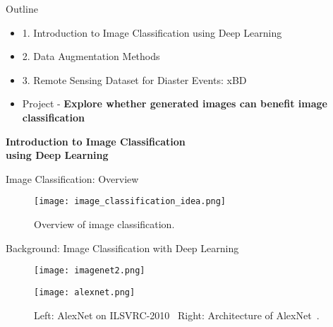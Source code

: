 
\begin{refsection}
  \begin{frame}{Outline}
    \begin{itemize}
      \item 1. Introduction to Image Classification using Deep Learning
      \item 2. Data Augmentation Methods
      \item 3. Remote Sensing Dataset for Diaster Events: xBD
    \end{itemize}
    \begin{itemize}
      \item Project - \textbf{Explore whether generated images can benefit image classification}
    \end{itemize}
  \end{frame}
\end{refsection}

\begin{refsection}
  \begin{frame}
    \centering
    \vspace{2.5cm}
    {\LARGE \textbf{Introduction to Image Classification}\\[0.5em]
    \textbf{using Deep Learning}}
  \end{frame}
\end{refsection}


\begin{refsection}
  \begin{frame}{Image Classification: Overview}
    \begin{figure}
      \centering
      \texttt{[image: image\_classification\_idea.png]}
      \caption{\scriptsize Overview of image classification.}
    \end{figure}
    \bottomleftrefs
  \end{frame}
\end{refsection}

\begin{refsection}
  \begin{frame}{Background: Image Classification with Deep Learning}
    \begin{figure}
      \centering
      \begin{minipage}{0.48\linewidth}
        \centering
        \texttt{[image: imagenet2.png]}
      \end{minipage}\hfill
      \begin{minipage}{0.48\linewidth}
        \centering
        \texttt{[image: alexnet.png]}
      \end{minipage}
      \caption[]{\scriptsize Left: AlexNet on ILSVRC-2010~\parencite{imagenet2010challenge} \quad Right: Architecture of AlexNet~\parencite{krizhevskyImageNetClassificationDeep2012}.}
    \end{figure}
    \bottomleftrefs
  \end{frame}
\end{refsection}



